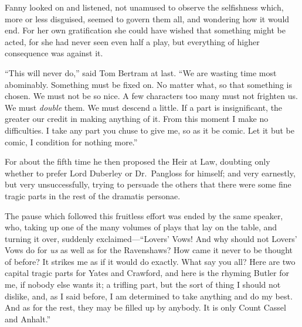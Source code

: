 \documentclass{article}
\begin{document}
Fanny looked on and listened, not unamused to observe
the selfishness which, more or less disguised, seemed to
govern them all, and wondering how it would end.  For her
own gratification she could have wished that something
might be acted, for she had never seen even half a play,
but everything of higher consequence was against it.

``This will never do,'' said Tom Bertram at last.  ``We are
wasting time most abominably.  Something must be fixed on.
No matter what, so that something is chosen.  We must not be
so nice.  A few characters too many must not frighten us.
We must \emph{double} them.  We must descend a little.
If a part is insignificant, the greater our credit in making
anything of it.  From this moment I make no difficulties.
I take any part you chuse to give me, so as it be comic.
Let it but be comic, I condition for nothing more.''

For about the fifth time he then proposed the Heir at Law,
doubting only whether to prefer Lord Duberley or Dr.\ Pangloss
for himself; and very earnestly, but very unsuccessfully,
trying to persuade the others that there were some fine
tragic parts in the rest of the dramatis personae.

The pause which followed this fruitless effort
was ended by the same speaker, who, taking up one
of the many volumes of plays that lay on the table,
and turning it over, suddenly exclaimed---``Lovers' Vows!
And why should not Lovers' Vows do for \emph{us} as well
as for the Ravenshaws?  How came it never to be thought
of before?  It strikes me as if it would do exactly.
What say you all?  Here are two capital tragic parts for
Yates and Crawford, and here is the rhyming Butler for me,
if nobody else wants it; a trifling part, but the sort
of thing I should not dislike, and, as I said before,
I am determined to take anything and do my best.
And as for the rest, they may be filled up by anybody.
It is only Count Cassel and Anhalt.''
\end{document}

